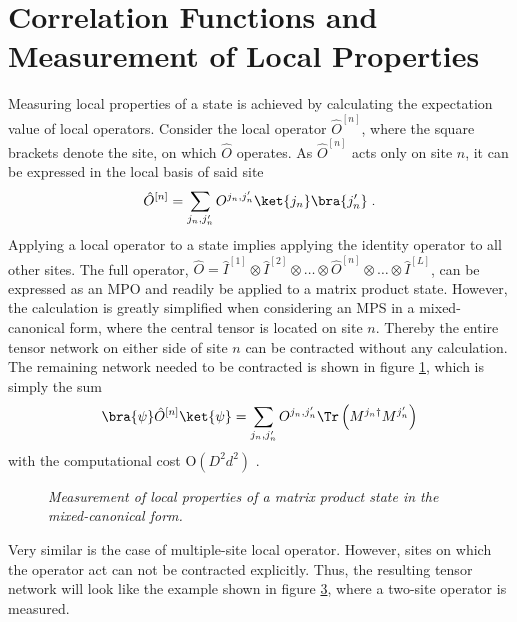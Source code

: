 \section{Correlation Functions and Measurement of Local Properties}
\label{sec:correlationFunctions}
Measuring local properties of a state is achieved by calculating the expectation value of local operators. Consider the local operator $\hat{O}^{[n]}$, where the square brackets denote the site, on which $\hat{O}$ operates. As $\hat{O}^{[n]}$ acts only on site $n$, it can be expressed in the local basis of said site
\begin{equation}
	\hat{O}^{[n]} = \sum_{j_n , j_n '} O^{j_n , j_n '} \ket{j_n} \bra{j_n '} \; .
	\label{eq:localOperator}
\end{equation}
Applying a local operator to a state implies applying the identity operator to all other sites. The full operator, $\hat{O} = \hat{I}^{[1]} \otimes \hat{I}^{[2]} \otimes \ldots \otimes \hat{O}^{[n]} \otimes \ldots \otimes \hat{I}^{[L]}$, can be expressed as an MPO and readily be applied to a matrix product state. However, the calculation is greatly simplified when considering an MPS in a mixed-canonical form, where the central tensor is located on site $n$. Thereby the entire tensor network on either side of site $n$ can be contracted without any calculation. The remaining network needed to be contracted is shown in figure \ref{fig:SingleSiteOperator}, which is simply the sum
\begin{equation}
	\bra{\psi} \hat{O}^{[n]} \ket{\psi} = \sum_{j_n , j_n '} O^{j_n , j_n '} \Tr \left( M^{j_n \dag} M^{j_n '} \right) 
\end{equation}
with the computational cost $\mathrm{O}(D^2 d^2)$ \cite{schollwock}.
\begin{figure}[h!]
\centering %
\begin{subfigure}[b]{0.35\textwidth}
	\caption{}
  	
	\label{fig:SingleSiteOperator}
\end{subfigure}
\begin{subfigure}[b]{0.35\textwidth}
	\caption{}    
  	
	\label{fig:DoubleSiteOperator}
\end{subfigure}
\caption{\textit{Measurement of local properties of a matrix product state in the mixed-canonical form.}}
\end{figure}
Very similar is the case of multiple-site local operator. However, sites on which the operator act can not be contracted explicitly. Thus, the resulting tensor network will look like the example shown in figure \ref{fig:DoubleSiteOperator}, where a two-site operator is measured.\\

